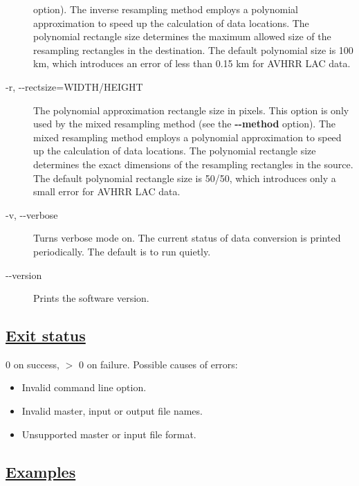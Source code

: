 \begin{description}
 option). The inverse resampling method employs a polynomial approximation to speed up the calculation of data locations. The polynomial rectangle size determines the maximum allowed size of the resampling rectangles in the destination. The default polynomial size is 100 km, which introduces an error of less than 0.15 km for AVHRR LAC data.
\item[-r, -{-}rectsize=WIDTH/HEIGHT]The polynomial approximation rectangle size in pixels. This option is only used by the mixed resampling method (see the \textbf{-{-}method}
 option). The mixed resampling method employs a polynomial approximation to speed up the calculation of data locations. The polynomial rectangle size determines the exact dimensions of the resampling rectangles in the source. The default polynomial rectangle size is 50/50, which introduces only a small error for AVHRR LAC data.
\item[-v, -{-}verbose]Turns verbose mode on. The current status of data conversion is printed periodically. The default is to run quietly.
\item[-{-}version]Prints the software version.

\end{description}
\subsection*{\underline{Exit status}}


  0 on success, $>$ 0 on failure. Possible causes of errors:
\begin{itemize}
\item  Invalid command line option. 
\item  Invalid master, input or output file names. 
\item  Unsupported master or input file format. 

\end{itemize}
\subsection*{\underline{Examples}}


